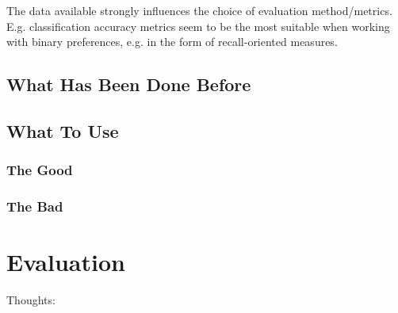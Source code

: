 The data available strongly influences the choice of evaluation method/metrics. E.g. classification accuracy metrics seem to be the most suitable when working with binary preferences, e.g. in the form of recall-oriented measures.

\subsection{What Has Been Done Before}



\subsection{What To Use}
\subsubsection{The Good}
\subsubsection{The Bad}

\section{Evaluation}



Thoughts:

